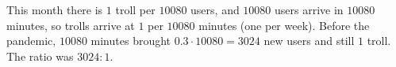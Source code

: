 This month there is $1$ troll per $10080$ users, and $10080$ users arrive in $10080$ minutes, so trolls arrive at $1$ per $10080$ minutes (one per week). Before the pandemic, $10080$ minutes brought $0.3\cdot10080=3024$ new users and still $1$ troll. The ratio was $\boxed{3024:1}$.
